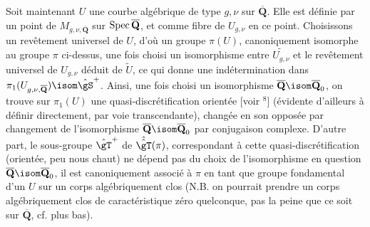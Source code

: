 Soit maintenant $U$ une courbe algébrique de type $g,\nu$
sur $\overline{\mathbf{Q}}$.  Elle est définie par un point de
$M_{g,\nu,\overline{\mathbf{Q}}}$ sur ${\rm Spec}\,  \overline{\mathbf{Q}}$,
et comme fibre de $U_{g,\nu}$ en ce point.  Choisissons
un revêtement universel de $U$, d'où un groupe
$\pi(U)$, canoniquement isomorphe au groupe $\pi$ ci-dessus, une
fois choisi un isomorphisme entre $\widetilde{U_{g,\nu}}$ et
le revêtement universel de $U_{g,\nu}$ déduit de
$\widetilde{U}$, ce qui donne une indétermination dans 
$\pi_1(U_{{g,\nu},\overline{\mathbf{Q}}}) \isom \hat\gS^+$.
Ainsi, une fois choisi un isomorphisme $\overline{\mathbf{Q}}
 \isom \overline{\mathbf{Q}}_0$, on trouve sur $\pi_1(U)$ une
quasi-discrétification orientée [voir ${}^8$] (évidente d'ailleurs
à définir directement, par voie transcendante), changée en son opposée
par changement de l'isomorphisme $\overline{\mathbf{Q}} \isom 
\overline{\mathbf{Q}}_0$ par conjugaison complexe.  D'autre part,
le sous-groupe $\hat\gT^+$ de $\hat{\hat\gT}(\pi)$,
correspondant à cette quasi-discrétification (orientée,
peu nous chaut) ne dépend pas du choix de l'isomorphisme
en question $\overline{\mathbf{Q}} \isom \overline{\mathbf{Q}}_0$, il
est canoniquement associé à $\pi$ en tant que groupe
fondamental d'un $U$ sur un corps algébriquement
clos (N.B. on pourrait prendre un corps algébriquement
clos de caractéristique zéro quelconque, pas la peine
que ce soit sur $\overline{\mathbf{Q}}$, cf. plus bas).


